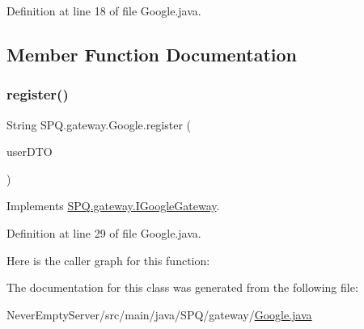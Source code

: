 Definition at line 18 of file Google.\+java.



\subsection{Member Function Documentation}
\mbox{\label{class_s_p_q_1_1gateway_1_1_google_ab287ce4fd789224c45be6037a99a937b}} 
\subsubsection{\texorpdfstring{register()}{register()}}
{\footnotesize\ttfamily String S\+P\+Q.\+gateway.\+Google.\+register (\begin{DoxyParamCaption}\item[{\mbox{\hyperlink{class_s_p_q_1_1dto_1_1_user_d_t_o}{User\+D\+TO}}}]{user\+D\+TO }\end{DoxyParamCaption})}



Implements \mbox{\hyperlink{interface_s_p_q_1_1gateway_1_1_i_google_gateway_a35bfcf888bfbf45ab05f33c89348052a}{S\+P\+Q.\+gateway.\+I\+Google\+Gateway}}.



Definition at line 29 of file Google.\+java.

Here is the caller graph for this function\+:


The documentation for this class was generated from the following file\+:\begin{DoxyCompactItemize}
\item 
Never\+Empty\+Server/src/main/java/\+S\+P\+Q/gateway/\mbox{\hyperlink{_google_8java}{Google.\+java}}\end{DoxyCompactItemize}
